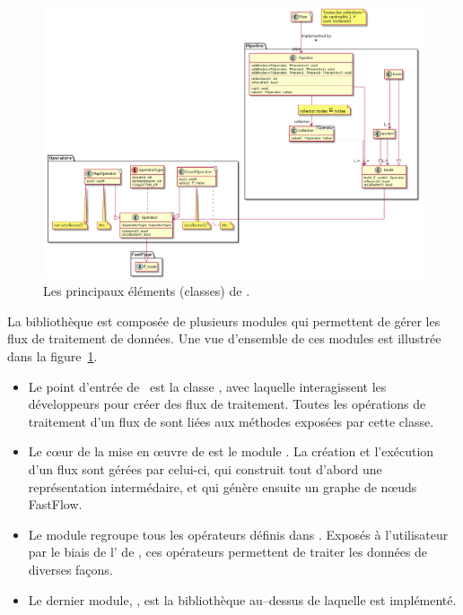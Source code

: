 \begin{figure}
\centering
     \includegraphics[width=1.0\textwidth]{Figures/all.png}
      \caption{Les principaux éléments (classes) de .}
       \label{All.fig}
\end{figure}

La biblioth\`eque  est compos\'ee de plusieurs modules qui permettent de g\'erer les flux de traitement de donn\'ees. Une vue d'ensemble de ces modules est illustr\'ee dans la figure~\ref{All.fig}.

\begin{itemize}

\item Le point d'entr\'ee de \ppff\ est la classe , avec laquelle interagissent les d\'eveloppeurs pour cr\'eer des flux de traitement. Toutes les op\'erations de traitement d'un flux de  sont li\'ees aux m\'ethodes expos\'ees par cette classe. 

\item Le c\oe{}ur de la mise en \oe{}uvre de  est le module . La cr\'eation et l'ex\'ecution d'un flux sont g\'er\'ees par celui-ci, qui construit tout d'abord une représentation intermédaire, et qui génère ensuite un graphe de n\oe{}uds FastFlow.

\item  Le module  regroupe tous les op\'erateurs d\'efinis dans . Expos\'es \`a l'utilisateur par le biais de l' de , ces op\'erateurs permettent de traiter les donn\'ees de diverses façons.

\item Le dernier module, , est la biblioth\`eque au–dessus de laquelle  est impl\'ement\'e.


\end{itemize}

